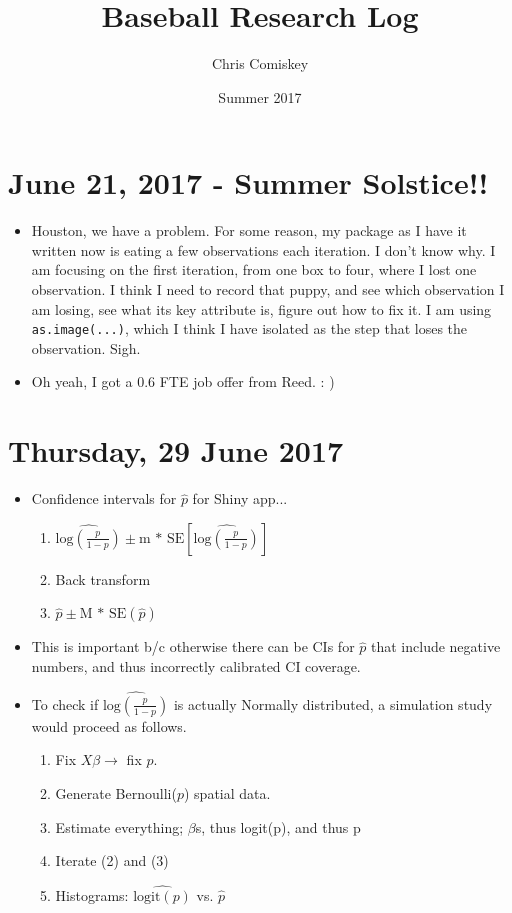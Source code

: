\documentclass{article}
\title{Baseball Research Log}
\author{Chris Comiskey}
\date{Summer 2017}
\begin{document}
\maketitle{}

\section*{June 21, 2017 - Summer Solstice!!}
\begin{itemize}
\item Houston, we have a problem. For some reason, my package as I have it written now is eating a few observations each iteration. I don't know why. I am focusing on the first iteration, from one box to four, where I lost one observation. I think I need to record that puppy, and see which observation I am losing, see what its key attribute is, figure out how to fix it. I am using \verb|as.image(...)|, which I think I have isolated as the step that loses the observation. Sigh.
\item Oh yeah, I got a 0.6 FTE job offer from Reed. : )
\end{itemize}

\section*{Thursday, 29 June 2017}
\begin{itemize}
\item Confidence intervals for $\hat{p}$ for Shiny app...
  \begin{enumerate}
  \item $\widehat{ \text{log} \left(\frac{p}{1-p} \right) }
  \pm \text{m * SE}
  \left[ \widehat{ \text{log}\left(\frac{p}{1-p}\right)} \right]$
  \item Back transform
  \item $\hat{p} \pm \text{M * SE}(\hat{p})$
  \end{enumerate}
\item This is important b/c otherwise there can be CIs for $\hat{p}$ that include negative numbers, and thus incorrectly calibrated CI coverage.
\item To check if $\widehat{ \text{log}\left(\frac{p}{1-p}\right)}$ is actually Normally distributed, a simulation study would proceed as follows.
  \begin{enumerate}
  \item Fix $X\beta \rightarrow$ fix $p$.
  \item Generate Bernoulli($p$) spatial data.
  \item Estimate everything; $\beta$s, thus logit(p), and thus p
  \item Iterate (2) and (3)
  \item Histograms: $\widehat{\text{logit}(p)}$ vs. $\hat{p}$
  \end{enumerate}
\end{itemize}
\end{document}
